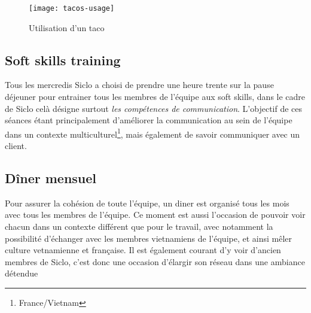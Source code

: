 \documentclass[rapport.tex]{subfiles}
\begin{document}
        \begin{figure}
            \centering
            \texttt{[image: tacos-usage]}
            \caption{Utilisation d'un taco}\label{fig:taco}
        \end{figure}

        \subsection{Soft skills training}
        Tous les mercredis Siclo a choisi de prendre une heure trente sur la pause déjeuner pour entrainer tous les membres de 
        l'équipe aux \og soft skills\fg, dans le cadre de Siclo celà désigne
        surtout \emph{les compétences de communication}.
        L'objectif de ces séances étant principalement d'améliorer la
        communication au sein de l'équipe dans un contexte
        multiculturel\footnote{France/Vietnam}, mais également de savoir
        communiquer avec un client.

        \subsection{Dîner mensuel}
        Pour assurer la cohésion de toute l'équipe, un diner est organisé tous les mois avec tous les membres de l'équipe.
        Ce moment est aussi l'occasion de pouvoir voir chacun dans un contexte différent que pour le travail, avec notamment la possibilité
        d'échanger avec les membres vietnamiens de l'équipe, et ainsi mêler culture vetnamienne et française.
        Il est également courant d'y voir d'ancien membres de Siclo, c'est donc une occasion d'élargir son réseau dans une ambiance détendue
\end{document}
